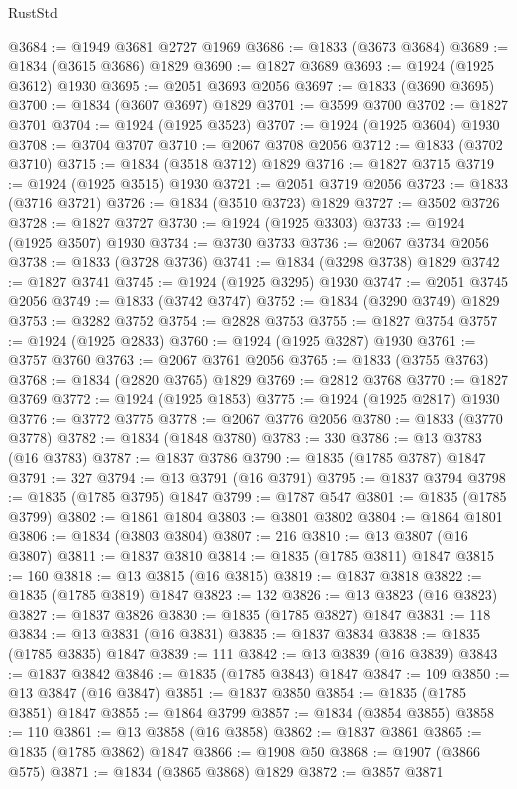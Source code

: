 \begin{lexlean}{RustStd}
\begin{coremodule}
@3684 := @1949 @3681 @2727 @1969
@3686 := @1833 (@3673 @3684)
@3689 := @1834 (@3615 @3686) @1829
@3690 := @1827 @3689
@3693 := @1924 (@1925 @3612) @1930
@3695 := @2051 @3693 @2056
@3697 := @1833 (@3690 @3695)
@3700 := @1834 (@3607 @3697) @1829
@3701 := @3599 @3700
@3702 := @1827 @3701
@3704 := @1924 (@1925 @3523)
@3707 := @1924 (@1925 @3604) @1930
@3708 := @3704 @3707
@3710 := @2067 @3708 @2056
@3712 := @1833 (@3702 @3710)
@3715 := @1834 (@3518 @3712) @1829
@3716 := @1827 @3715
@3719 := @1924 (@1925 @3515) @1930
@3721 := @2051 @3719 @2056
@3723 := @1833 (@3716 @3721)
@3726 := @1834 (@3510 @3723) @1829
@3727 := @3502 @3726
@3728 := @1827 @3727
@3730 := @1924 (@1925 @3303)
@3733 := @1924 (@1925 @3507) @1930
@3734 := @3730 @3733
@3736 := @2067 @3734 @2056
@3738 := @1833 (@3728 @3736)
@3741 := @1834 (@3298 @3738) @1829
@3742 := @1827 @3741
@3745 := @1924 (@1925 @3295) @1930
@3747 := @2051 @3745 @2056
@3749 := @1833 (@3742 @3747)
@3752 := @1834 (@3290 @3749) @1829
@3753 := @3282 @3752
@3754 := @2828 @3753
@3755 := @1827 @3754
@3757 := @1924 (@1925 @2833)
@3760 := @1924 (@1925 @3287) @1930
@3761 := @3757 @3760
@3763 := @2067 @3761 @2056
@3765 := @1833 (@3755 @3763)
@3768 := @1834 (@2820 @3765) @1829
@3769 := @2812 @3768
@3770 := @1827 @3769
@3772 := @1924 (@1925 @1853)
@3775 := @1924 (@1925 @2817) @1930
@3776 := @3772 @3775
@3778 := @2067 @3776 @2056
@3780 := @1833 (@3770 @3778)
@3782 := @1834 (@1848 @3780)
@3783 := 330
@3786 := @13 @3783 (@16 @3783)
@3787 := @1837 @3786
@3790 := @1835 (@1785 @3787) @1847
@3791 := 327
@3794 := @13 @3791 (@16 @3791)
@3795 := @1837 @3794
@3798 := @1835 (@1785 @3795) @1847
@3799 := @1787 @547
@3801 := @1835 (@1785 @3799)
@3802 := @1861 @1804
@3803 := @3801 @3802
@3804 := @1864 @1801
@3806 := @1834 (@3803 @3804)
@3807 := 216
@3810 := @13 @3807 (@16 @3807)
@3811 := @1837 @3810
@3814 := @1835 (@1785 @3811) @1847
@3815 := 160
@3818 := @13 @3815 (@16 @3815)
@3819 := @1837 @3818
@3822 := @1835 (@1785 @3819) @1847
@3823 := 132
@3826 := @13 @3823 (@16 @3823)
@3827 := @1837 @3826
@3830 := @1835 (@1785 @3827) @1847
@3831 := 118
@3834 := @13 @3831 (@16 @3831)
@3835 := @1837 @3834
@3838 := @1835 (@1785 @3835) @1847
@3839 := 111
@3842 := @13 @3839 (@16 @3839)
@3843 := @1837 @3842
@3846 := @1835 (@1785 @3843) @1847
@3847 := 109
@3850 := @13 @3847 (@16 @3847)
@3851 := @1837 @3850
@3854 := @1835 (@1785 @3851) @1847
@3855 := @1864 @3799
@3857 := @1834 (@3854 @3855)
@3858 := 110
@3861 := @13 @3858 (@16 @3858)
@3862 := @1837 @3861
@3865 := @1835 (@1785 @3862) @1847
@3866 := @1908 @50
@3868 := @1907 (@3866 @575)
@3871 := @1834 (@3865 @3868) @1829
@3872 := @3857 @3871

\end{coremodule}
\end{lexlean}
